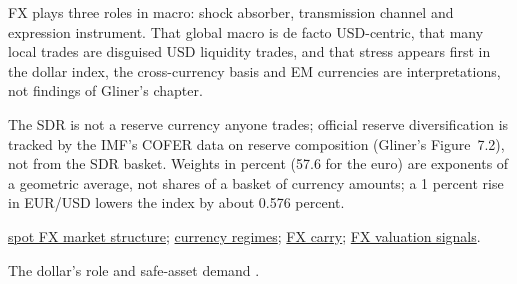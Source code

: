 \begin{qfdefinition}
 FX plays three roles in macro: shock absorber, transmission channel and expression instrument. That global macro is de facto USD-centric, that many local trades are disguised USD liquidity trades, and that stress appears first in the dollar index, the cross-currency basis and EM currencies are interpretations, not findings of Gliner's chapter.

 The SDR is not a reserve currency anyone trades; official reserve diversification is tracked by the IMF's COFER data on reserve composition (Gliner's Figure~7.2), not from the SDR basket. Weights in percent (57.6 for the euro) are exponents of a geometric average, not shares of a basket of currency amounts; a 1 percent rise in EUR/USD lowers the index by about 0.576 percent.

 \hyperref[def:fx-market-structure]{spot FX market structure}; \hyperref[def:currency-regimes-intervention]{currency regimes}; \hyperref[mod:fx-carry-trade]{FX carry}; \hyperref[meth:fx-valuation-signals]{FX valuation signals}.

 The dollar's role and safe-asset demand \citep{wide-jkl-safe-asset}.

\end{qfdefinition}

